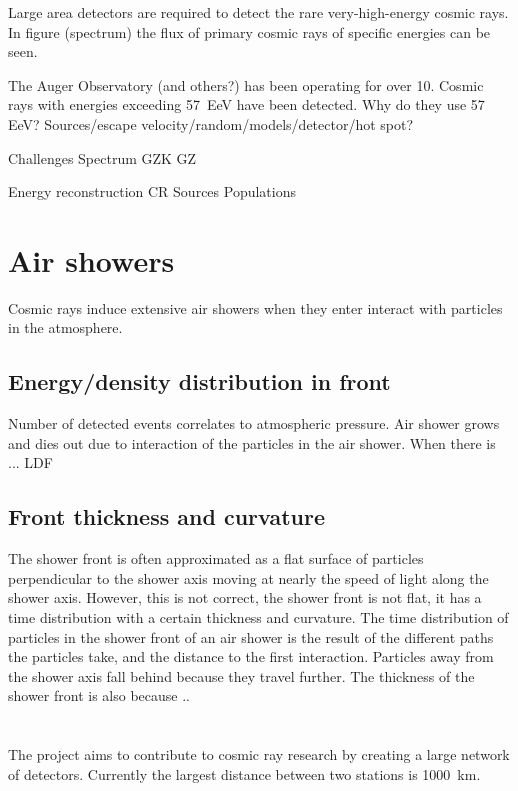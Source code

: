 Large area detectors are required to detect the rare very-high-energy
cosmic rays. In figure (spectrum) the flux of primary cosmic rays of
specific energies can be seen.

The Auger Observatory (and others?) has been operating for over
\SI{10}{\year}. Cosmic rays with energies exceeding
\SI{57}{\exa\electronvolt} have been detected. Why do they use 57 EeV?
Sources/escape velocity/random/models/detector/hot spot?

Challenges
Spectrum
GZK
GZ

Energy reconstruction
CR Sources
Populations


\section{Air showers}

Cosmic rays induce extensive air showers when they enter interact with particles in the atmosphere.


\subsection{Energy/density distribution in front}

Number of detected events correlates to atmospheric pressure.
Air shower grows and dies out due to interaction of the particles in the air shower. When there is
... LDF


\subsection{Front thickness and curvature}

The shower front is often approximated as a flat surface  of particles
perpendicular to the shower axis moving at nearly the speed of light
along the shower axis. However, this is not correct, the shower front is
not flat, it has a time distribution with a certain thickness and
curvature. The time distribution of particles in the shower front of an
air shower is the result of the different paths the particles take, and
the distance to the first interaction. Particles away from the shower
axis fall behind because they travel further. The thickness of the
shower front is also because ..


\section{\hisparc}

The \hisparc project aims to contribute to cosmic ray research by
creating a large network of detectors. Currently the largest distance
between two stations is \SI{1000}{\kilo\meter}.


